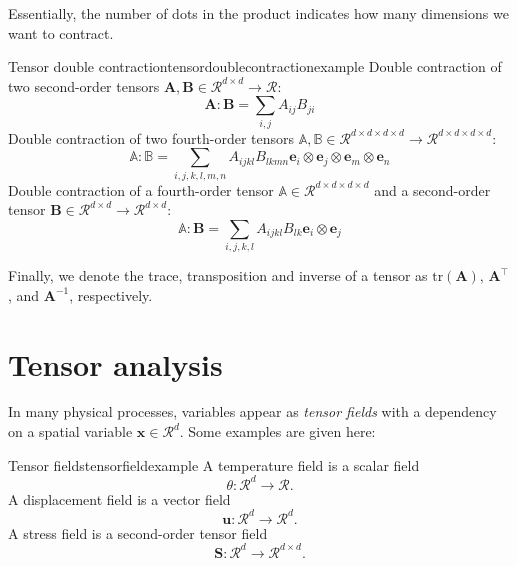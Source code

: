 Essentially, the number of dots in the product indicates how many dimensions we want to contract.

\begin{example}{Tensor double contraction}{tensordoublecontractionexample}
    Double contraction of two second-order tensors $\mathbf{A},\mathbf{B} \in \mathcal{R}^{d \times d} \rightarrow \mathcal{R}$: 
    \begin{equation}
        \mathbf{A} : \mathbf{B} = \sum_{i,j} A_{ij} B_{ji} 
    \end{equation}
    Double contraction of two fourth-order tensors $\mathbb{A},\mathbb{B} \in \mathcal{R}^{d \times d \times d \times d} \rightarrow \mathcal{R}^{d \times d \times d \times d}$: 
    \begin{equation}
        \mathbb{A} : \mathbb{B} = \sum_{i,j,k,l,m,n} A_{ijkl} B_{lkmn} \mathbf{e}_i \otimes \mathbf{e}_j \otimes \mathbf{e}_m \otimes \mathbf{e}_n
    \end{equation}
    Double contraction of a fourth-order tensor $\mathbb{A} \in \mathcal{R}^{d \times d \times d \times d}$ and a second-order tensor $\mathbf{B} \in \mathcal{R}^{d \times d} \rightarrow \mathcal{R}^{d \times d}$: 
    \begin{equation}
        \mathbb{A} : \mathbf{B} = \sum_{i,j,k,l} A_{ijkl} B_{lk} \mathbf{e}_i \otimes \mathbf{e}_j
    \end{equation}
\end{example}

Finally, we denote the trace, transposition and inverse of a tensor as $\text{tr}(\mathbf{A})$, $\mathbf{A}^\top$, and $\mathbf{A}^{-1}$, respectively.

\section{Tensor analysis}
In many physical processes, variables appear as \emph{tensor fields} with a dependency on a spatial variable $\mathbf{x} \in \mathcal{R}^d$. Some examples are given here:
\begin{example}{Tensor fields}{tensorfieldexample}
    A temperature field is a scalar field
    \begin{equation}
        \theta: \mathcal{R}^d \rightarrow \mathcal{R}.
    \end{equation}
    A displacement field is a vector field
    \begin{equation}
        \mathbf{u}: \mathcal{R}^d \rightarrow \mathcal{R}^d.
    \end{equation}
    A stress field is a second-order tensor field
    \begin{equation}
        \mathbf{S}: \mathcal{R}^d \rightarrow \mathcal{R}^{d \times d}.
    \end{equation}
\end{example}

